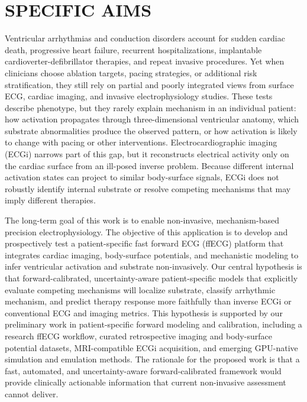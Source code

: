\documentclass[letterpaper]{article}
\begin{document}
\fontsize{11pt}{12pt}\selectfont
\RaggedRight

\section*{SPECIFIC AIMS}

Ventricular arrhythmias and conduction disorders account for sudden cardiac death, progressive heart failure, recurrent hospitalizations, implantable cardioverter-defibrillator therapies, and repeat invasive procedures. Yet when clinicians choose ablation targets, pacing strategies, or additional risk stratification, they still rely on partial and poorly integrated views from surface ECG, cardiac imaging, and invasive electrophysiology studies. These tests describe phenotype, but they rarely explain mechanism in an individual patient: how activation propagates through three-dimensional ventricular anatomy, which substrate abnormalities produce the observed pattern, or how activation is likely to change with pacing or other interventions. Electrocardiographic imaging (ECGi) narrows part of this gap, but it reconstructs electrical activity only on the cardiac surface from an ill-posed inverse problem. Because different internal activation states can project to similar body-surface signals, ECGi does not robustly identify internal substrate or resolve competing mechanisms that may imply different therapies.

The long-term goal of this work is to enable non-invasive, mechanism-based precision electrophysiology. The objective of this application is to develop and prospectively test a patient-specific fast forward ECG (ffECG) platform that integrates cardiac imaging, body-surface potentials, and mechanistic modeling to infer ventricular activation and substrate non-invasively. Our central hypothesis is that forward-calibrated, uncertainty-aware patient-specific models that explicitly evaluate competing mechanisms will localize substrate, classify arrhythmic mechanism, and predict therapy response more faithfully than inverse ECGi or conventional ECG and imaging metrics. This hypothesis is supported by our preliminary work in patient-specific forward modeling and calibration, including a research ffECG workflow, curated retrospective imaging and body-surface potential datasets, MRI-compatible ECGi acquisition, and emerging GPU-native simulation and emulation methods. The rationale for the proposed work is that a fast, automated, and uncertainty-aware forward-calibrated framework would provide clinically actionable information that current non-invasive assessment cannot deliver.
\end{document}
